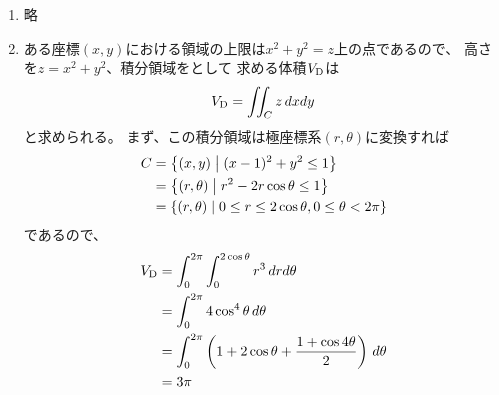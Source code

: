 \begin{ans*}
  ${}$
  \begin{enumerate}[label=(\arabic*)]
    \item 略 %
    \item ある座標$(x,y)$における領域の上限は$x^2+y^2=z$上の点であるので、
    高さを$z=x^2 + y^2$、積分領域をとして
    求める体積$V_{\rm{D}}$は
    \begin{gather}
      V_{\rm{D}} = \iint_C z \,dxdy
    \end{gather}
    と求められる。
    まず、この積分領域は極座標系$(r,\theta)$に変換すれば
    \begin{align}
      C
      &= \Dset{(x,y)\relmiddle (x-1)^2 + y^2 \leq 1} \\
      &= \Dset{(r,\theta)\relmiddle r^2 - 2r\cos\theta\leq 1} \\
      &= \Dset{(r,\theta)\relmiddle 0\leq r\leq 2\cos\theta, 0\leq \theta < 2\pi}
    \end{align}
    であるので、
    \begin{align}
      V_{\rm{D}}
      &= \int_{0}^{2\pi}\int_{0}^{2\cos\theta}r^3\,drd\theta \\
      &= \int_{0}^{2\pi} 4\cos^4\theta\,d\theta \\
      &= \int_{0}^{2\pi} \left(1 + 2\cos\theta + \frac{1 + \cos4\theta}{2}\right)\,d\theta \\
      &= 3\pi
    \end{align}
  \end{enumerate}

\end{ans*}


